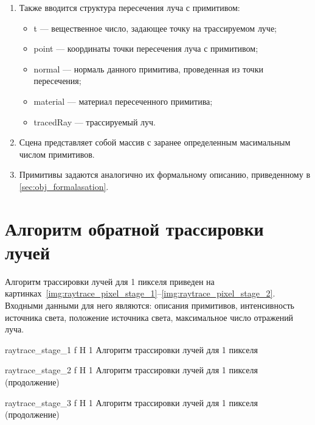 \begin{enumerate}
	\item  Также вводится структура пересечения луча с примитивом:
	\begin{itemize}
		\item t --- вещественное число, задающее точку на трассируемом луче;
		\item point --- координаты точки пересечения луча с примитивом;
		\item normal --- нормаль данного примитива, проведенная из точки пересечения;
		\item material --- материал пересеченного примитива;
		\item tracedRay --- трассируемый луч.
	\end{itemize}

	\item Сцена представляет собой массив с заранее определенным масимальным числом примитивов.
	\item Примитивы задаются аналогично их формальному описанию, приведенному в \ref{sec:obj_formalasation}.
\end{enumerate}



\section{Алгоритм обратной трассировки лучей}
Алгоритм трассировки лучей для 1 пикселя приведен на картинках~\ref{img:raytrace_pixel_stage_1}--\ref{img:raytrace_pixel_stage_2}. Входными данными для него являются: описания примитивов,
интенсивность источника света, положение источника света, максимальное число отражений луча.


{raytrace_stage_1} %
{f} %
{H} %
{1\textwidth} %
{Алгоритм трассировки лучей для 1 пикселя} %

{raytrace_stage_2} %
{f} %
{H} %
{1\textwidth} %
{Алгоритм трассировки лучей для 1 пикселя (продолжение)} %

{raytrace_stage_3} %
{f} %
{H} %
{1\textwidth} %
{Алгоритм трассировки лучей для 1 пикселя (продолжение)} %

